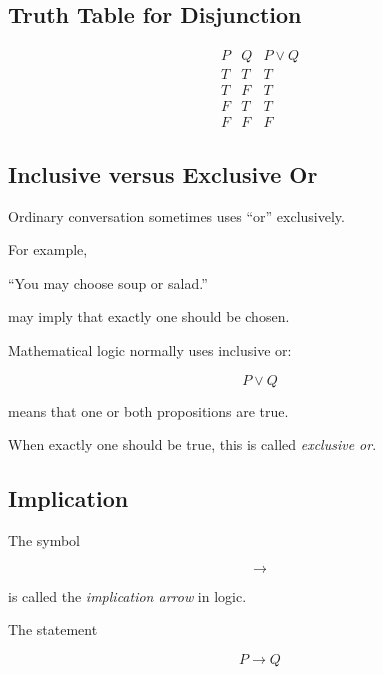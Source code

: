 \subsection{Truth Table for Disjunction}
\label{subsec:disjunction-truth-table}

\[
\begin{array}{c|c|c}
P & Q & P\lor Q\\ \hline
T & T & T\\
T & F & T\\
F & T & T\\
F & F & F
\end{array}
\]

\subsection{Inclusive versus Exclusive Or}
\label{subsec:inclusive-exclusive-or}

Ordinary conversation sometimes uses ``or'' exclusively.

For example,

\begin{center}
``You may choose soup or salad.''
\end{center}

may imply that exactly one should be chosen.

Mathematical logic normally uses inclusive or:

\[ P\lor Q \]

means that one or both propositions are true.

When exactly one should be true, this is called \emph{exclusive or}.

\subsection{Implication}
\label{subsec:implication}

The symbol

\[ \to \]

is called the \emph{implication arrow} in logic.

The statement

\[ P\to Q \]

